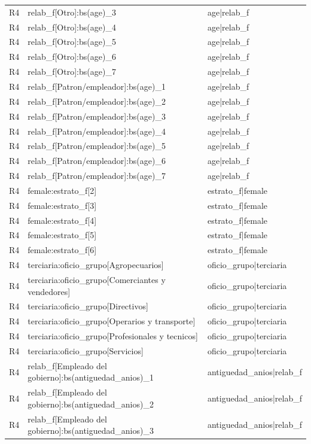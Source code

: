\begin{longtable}{lll}
R4 & relab\_f[Otro]:bs(age)\_3 & age|relab\_f \\
R4 & relab\_f[Otro]:bs(age)\_4 & age|relab\_f \\
R4 & relab\_f[Otro]:bs(age)\_5 & age|relab\_f \\
R4 & relab\_f[Otro]:bs(age)\_6 & age|relab\_f \\
R4 & relab\_f[Otro]:bs(age)\_7 & age|relab\_f \\
R4 & relab\_f[Patron/empleador]:bs(age)\_1 & age|relab\_f \\
R4 & relab\_f[Patron/empleador]:bs(age)\_2 & age|relab\_f \\
R4 & relab\_f[Patron/empleador]:bs(age)\_3 & age|relab\_f \\
R4 & relab\_f[Patron/empleador]:bs(age)\_4 & age|relab\_f \\
R4 & relab\_f[Patron/empleador]:bs(age)\_5 & age|relab\_f \\
R4 & relab\_f[Patron/empleador]:bs(age)\_6 & age|relab\_f \\
R4 & relab\_f[Patron/empleador]:bs(age)\_7 & age|relab\_f \\
R4 & female:estrato\_f[2] & estrato\_f|female \\
R4 & female:estrato\_f[3] & estrato\_f|female \\
R4 & female:estrato\_f[4] & estrato\_f|female \\
R4 & female:estrato\_f[5] & estrato\_f|female \\
R4 & female:estrato\_f[6] & estrato\_f|female \\
R4 & terciaria:oficio\_grupo[Agropecuarios] & oficio\_grupo|terciaria \\
R4 & terciaria:oficio\_grupo[Comerciantes y vendedores] & oficio\_grupo|terciaria \\
R4 & terciaria:oficio\_grupo[Directivos] & oficio\_grupo|terciaria \\
R4 & terciaria:oficio\_grupo[Operarios y transporte] & oficio\_grupo|terciaria \\
R4 & terciaria:oficio\_grupo[Profesionales y tecnicos] & oficio\_grupo|terciaria \\
R4 & terciaria:oficio\_grupo[Servicios] & oficio\_grupo|terciaria \\
R4 & relab\_f[Empleado del gobierno]:bs(antiguedad\_anios)\_1 & antiguedad\_anios|relab\_f \\
R4 & relab\_f[Empleado del gobierno]:bs(antiguedad\_anios)\_2 & antiguedad\_anios|relab\_f \\
R4 & relab\_f[Empleado del gobierno]:bs(antiguedad\_anios)\_3 & antiguedad\_anios|relab\_f \\

\end{longtable}

